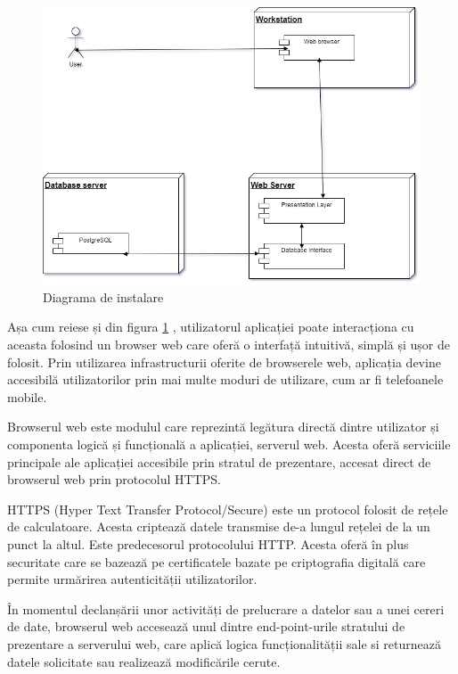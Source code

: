 \documentclass[12pt,a4paper]{report}
\theoremstyle{definition}
\theoremstyle{remark}
\begin{document}
\begin{figure}[H]
    \centering
    \includegraphics[width=0.75\linewidth]{resurse/diagrame/Diagrama_Arhitectura2.drawio.png}
    \caption{Diagrama de instalare}
    \label{fig:arhitect}
\end{figure}

\par Așa cum reiese și din figura \ref{fig:arhitect} , utilizatorul aplicației poate interacționa cu aceasta folosind un browser web care oferă o interfață intuitivă, simplă și ușor de folosit. Prin utilizarea infrastructurii oferite de browserele web, aplicația devine accesibilă utilizatorilor prin mai multe moduri de utilizare, cum ar fi telefoanele mobile.

\par Browserul web este modulul care reprezintă legătura directă dintre utilizator și componenta logică și funcțională a aplicației, serverul web. Acesta oferă serviciile principale ale aplicației accesibile prin stratul de prezentare, accesat direct de browserul web prin protocolul HTTPS.

\par HTTPS (Hyper Text Transfer Protocol/Secure) este un protocol folosit de rețele de calculatoare. Acesta criptează datele transmise de-a lungul rețelei de la un punct la altul. Este predecesorul protocolului HTTP. Acesta oferă în plus securitate care se bazează pe certificatele bazate pe criptografia digitală care permite urmărirea autenticității utilizatorilor.

\par În momentul declanșării unor activități de prelucrare a datelor sau a unei cereri de date, browserul web accesează unul dintre end-point-urile stratului de prezentare a serverului web, care aplică logica funcționalității sale si returnează datele solicitate sau realizează modificările cerute.
\end{document}
